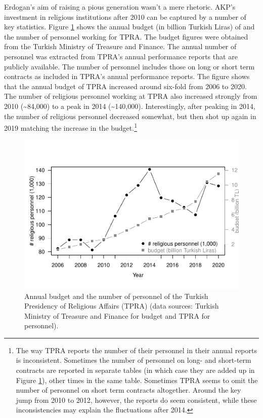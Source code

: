 \documentclass[
  12pt,
]{article}
\begin{document}
Erdogan's aim of raising a pious generation wasn't a mere rhetoric. AKP's investment in religious institutions after 2010 can be captured by a number of key statistics. Figure \ref{fig:fig-1} shows the annual budget (in billion Turkish Liras) of and the number of personnel working for TPRA. The budget figures were obtained from the Turkish Ministry of Treasure and Finance. The annual number of personnel was extracted from TPRA's annual performance reports that are publicly available. The number of personnel includes those on long or short term contracts as included in TPRA's annual performance reports. The figure shows that the annual budget of TPRA increased around six-fold from 2006 to 2020. The number of religious personnel working at TPRA also increased strongly from 2010 (\textasciitilde84,000) to a peak in 2014 (\textasciitilde140,000). Interestingly, after peaking in 2014, the number of religious personnel decreased somewhat, but then shot up again in 2019 matching the increase in the budget.\footnote{The way TPRA reports the number of their personnel in their annual reports is inconsistent. Sometimes the number of personnel on long- and short-term contracts are reported in separate tables (in which case they are added up in Figure \ref{fig:fig-1}), other times in the same table. Sometimes TPRA seems to omit the number of personnel on short term contracts altogether. Around the key jump from 2010 to 2012, however, the reports do seem consistent, while these inconsistencies may explain the fluctuations after 2014.}

\begin{figure}

{\centering \includegraphics{Khutbas_files/figure-latex/fig-1-1} 

}

\caption{Annual budget and the number of personnel of the Turkish Presidency of Religious Affairs (TPRA) (data sources: Turkish Ministry of Treasure and Finance for budget and TPRA for personnel).}\label{fig:fig-1}
\end{figure}
\end{document}
